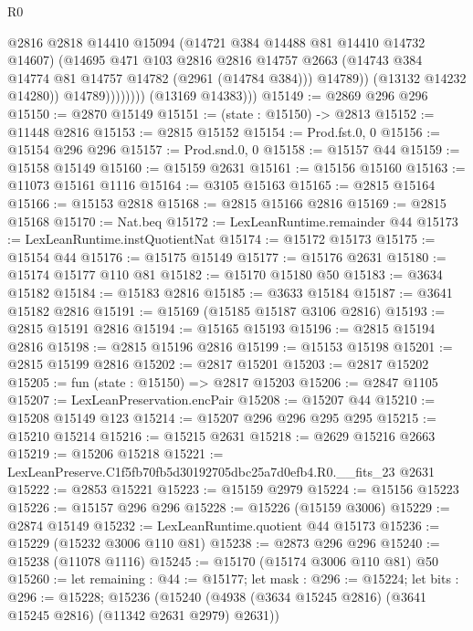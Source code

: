 \begin{lexlean}{R0}
\begin{coremodule}
                            @2816
                            @2818
                            @14410
                            @15094
                            (@14721 @384 @14488 @81 @14410 @14732 @14607)
                            (@14695
                              @471
                              @103
                              @2816
                              @2816
                              @14757
                              @2663
                              (@14743 @384 @14774 @81 @14757 @14782 (@2961 (@14784 @384)))
                              @14789))
                          (@13132 @14232 @14280))
                        @14789))))))))
        (@13169 @14383)))
@15149 := @2869 @296 @296
@15150 := @2870 @15149
@15151 := (state : @15150) -> @2813
@15152 := @11448 @2816
@15153 := @2815 @15152
@15154 := Prod.fst.{0, 0}
@15156 := @15154 @296 @296
@15157 := Prod.snd.{0, 0}
@15158 := @15157 @44
@15159 := @15158 @15149
@15160 := @15159 @2631
@15161 := @15156 @15160
@15163 := @11073 @15161 @1116
@15164 := @3105 @15163
@15165 := @2815 @15164
@15166 := @15153 @2818
@15168 := @2815 @15166 @2816
@15169 := @2815 @15168
@15170 := Nat.beq
@15172 := LexLeanRuntime.remainder @44
@15173 := LexLeanRuntime.instQuotientNat
@15174 := @15172 @15173
@15175 := @15154 @44
@15176 := @15175 @15149
@15177 := @15176 @2631
@15180 := @15174 @15177 @110 @81
@15182 := @15170 @15180 @50
@15183 := @3634 @15182
@15184 := @15183 @2816
@15185 := @3633 @15184
@15187 := @3641 @15182 @2816
@15191 := @15169 (@15185 @15187 @3106 @2816)
@15193 := @2815 @15191 @2816
@15194 := @15165 @15193
@15196 := @2815 @15194 @2816
@15198 := @2815 @15196 @2816
@15199 := @15153 @15198
@15201 := @2815 @15199 @2816
@15202 := @2817 @15201
@15203 := @2817 @15202
@15205 := fun (state : @15150) => @2817 @15203
@15206 := @2847 @1105
@15207 := LexLeanPreservation.encPair
@15208 := @15207 @44
@15210 := @15208 @15149 @123
@15214 := @15207 @296 @296 @295 @295
@15215 := @15210 @15214
@15216 := @15215 @2631
@15218 := @2629 @15216 @2663
@15219 := @15206 @15218
@15221 := LexLeanPreserve.C1f5fb70fb5d30192705dbc25a7d0efb4.R0.__fits_23 @2631
@15222 := @2853 @15221
@15223 := @15159 @2979
@15224 := @15156 @15223
@15226 := @15157 @296 @296
@15228 := @15226 (@15159 @3006)
@15229 := @2874 @15149
@15232 := LexLeanRuntime.quotient @44 @15173
@15236 := @15229 (@15232 @3006 @110 @81)
@15238 := @2873 @296 @296
@15240 := @15238 (@11078 @1116)
@15245 := @15170 (@15174 @3006 @110 @81) @50
@15260 := let remaining : @44 := @15177;
  let mask : @296 := @15224;
  let bits : @296 := @15228;
  @15236 (@15240 (@4938 (@3634 @15245 @2816) (@3641 @15245 @2816) (@11342 @2631 @2979) @2631))

\end{coremodule}
\end{lexlean}
